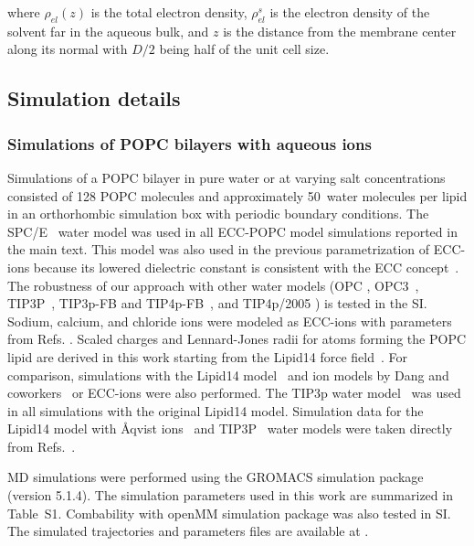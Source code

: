 \documentclass[aip,jcp,twocolumn]{revtex4}
\begin{document}
\noindent where $\rho_{el} (z)$ is the total electron density, $\rho_{el}^s$ is the electron density of the solvent far in the aqueous bulk, and $z$ is the distance from the membrane center along its normal with $D/2$ being half of the unit cell size.  




\subsection{Simulation details}

\subsubsection{Simulations of POPC bilayers with aqueous ions}
Simulations of a POPC bilayer in pure water or at varying salt concentrations consisted of 128 POPC molecules
and approximately 50~water molecules per lipid in an orthorhombic simulation box with periodic boundary conditions.
The SPC/E~\cite{Berendsen1987} water model was used in all ECC-POPC model simulations reported
in the main text. This model was also used in the previous parametrization
of ECC-ions \cite{martinek17, kohagen16, Pluharova2014} because its lowered dielectric constant is consistent with
the ECC concept~\cite{leontyev11, leontyev14}.
The robustness of our approach with other water models (OPC \cite{Izadi14},
OPC3~\cite{Izadi16}, TIP3P~\cite{jorgensen83}, TIP3p-FB and TIP4p-FB~\cite{Wang2014}, and TIP4p/2005 \cite{Abascal2005})
is tested in the SI.
Sodium, calcium, and chloride ions were modeled as ECC-ions
with parameters from Refs. . Scaled charges and Lennard-Jones radii for atoms
forming the POPC lipid are derived in this work starting from the Lipid14 force field~\cite{dickson14}.
For comparison, simulations with the Lipid14 model~\cite{dickson14} and
ion models by Dang and coworkers~\cite{smith94,chang1999,dang2006} or ECC-ions \cite{martinek17, kohagen16, Pluharova2014}
were also performed. The TIP3p water model~\cite{jorgensen83} was used in all simulations with the original Lipid14 model.
Simulation data for the Lipid14 model with \AA{}qvist ions~\cite{aqvist90} and TIP3P~\cite{jorgensen83} water models were taken directly from
Refs.~.  

MD simulations were performed using the GROMACS \cite{Abraham15} simulation package (version 5.1.4). The simulation parameters used
in this work are summarized in Table~S1. Combability with openMM simulation package \cite{openmm7} was also
tested in SI. The simulated trajectories and parameters files are available at \cite{??} .
\end{document}
